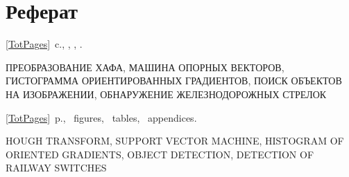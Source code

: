\chapter*[Count-me]{Реферат} %
\thispagestyle{empty}%
%
%



\ref*{TotPages}~c.,
,
,
.  

\justify
{\noindent\MakeUppercase{преобразование хафа, машина опорных векторов, гистограмма ориентированных градиентов, поиск объектов на изображении, обнаружение железнодорожных стрелок}} %

\abstractRu %




\printTheAbstract %


\ref*{TotPages}~p.,
~figures, 
~tables,
~appendices.


{\noindent\MakeUppercase{hough transform, support vector machine, histogram of oriented gradients, object detection, detection of railway switches}} %
	
\abstractEn %

	


\thispagestyle{empty}
%
